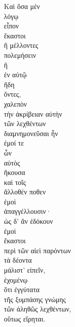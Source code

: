 {\large
\begin{greek}
\noindent Καὶ ὅσα μὲν \\
\tabto{2em} λόγῳ \\
εἶπον \\
ἕκαστοι\\
\tabto{2em} ἢ μέλλοντες \\
\tabto{4em} πολεμήσειν\\
\tabto{2em} ἢ \\
\tabto{4em} ἐν αὐτῷ \\
\tabto{4em} ἤδη \\
\tabto{2em} ὄντες, \\
χαλεπὸν \\
τὴν ἀκρίβειαν αὐτὴν \\
\tabto{2em} τῶν λεχθέντων \\
διαμνημονεῦσαι ἦν \\
\tabto{2em} ἐμοί τε\\
\tabto{4em} ὧν \\
\tabto{4em} αὐτὸς \\
\tabto{4em} ἤκουσα \\
\tabto{2em} καὶ τοῖς \\
\tabto{4em} ἄλλοθέν ποθεν \\
\tabto{4em} ἐμοὶ \\
\tabto{2em} ἀπαγγέλλουσιν· \\
ὡς δ' ἂν ἐδόκουν \\
ἐμοὶ \\
\tabto{2em} ἕκαστοι \\
\tabto{4em} περὶ τῶν αἰεὶ παρόντων \\
\tabto{4em} τὰ δέοντα \\
\tabto{2em} μάλιστ' εἰπεῖν,\\
ἐχομένῳ \\
ὅτι ἐγγύτατα \\
\tabto{2em} τῆς ξυμπάσης γνώμης \\
\tabto{4em} τῶν ἀληθῶς λεχθέντων, \\
οὕτως εἴρηται.\\

\end{greek}
}

